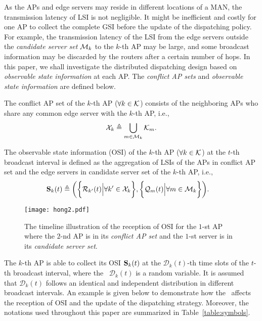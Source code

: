 As the APs and edge servers may reside in different locations of a MAN, the transmission latency of LSI is not negligible.
It might be inefficient {and costly} for one AP to collect the complete GSI before the update of the dispatching policy.
For example, the transmission latency of the LSI from the edge servers outside the \emph{candidate server set} $\mathcal{M}_{k}$ to the $k$-th AP may be large, and some broadcast information may be discarded by the routers after a certain number of hops.
In this paper, we shall investigate the distributed dispatching design based on \emph{observable state information} at each AP.
The \emph{conflict AP sets} and \emph{observable state information} are defined below.
\begin{definition}
    The conflict AP set of the $k$-th AP ($\forall k\in\mathcal{K}$) consists of the neighboring APs who share any common edge server with the $k$-th AP, i.e.,
    \begin{align}
        \mathcal{X}_{k} \triangleq \bigcup_{m\in\mathcal{M}_{k}} \mathcal{K}_{m}.
    \end{align}
\end{definition}

\begin{definition}
    The observable state information (OSI) of the $k$-th AP ($\forall k\in\mathcal{K}$) at the $t$-th broadcast interval is defined as the aggregation of LSIs of the APs in {conflict AP set} and the edge servers in {candidate server set} of the $k$-th AP, i.e.,
    {\small
    \begin{align}
        \mathbf{S}_{k}(t) &\triangleq
        \bigg(
            \bigg\{\mathcal{R}_{k'}(t) \Big| \forall k'\in\mathcal{X}_{k}\bigg\},
            \bigg\{\mathcal{Q}_{m}(t) \Big| \forall m\in\mathcal{M}_{k}\bigg\}
        \bigg).
    \end{align}
    }%
    \label{def:OSI}
\end{definition}

\begin{figure*}[t]
    \centering
    \texttt{[image: hong2.pdf]}
    \caption{The timeline illustration of the reception of OSI for the $1$-st AP where the $2$-nd AP is in its \emph{conflict AP set} and the $1$-st server is in its \emph{candidate server set}.}
    \label{fig:brd_timeline}
\end{figure*}

The $k$-th AP is able to collect its OSI $\mathbf{S}_{k}(t)$ at the $\mathcal{D}_{k}(t)$-th time slots of the $t$-th broadcast interval, where the \emph{\brlatency}~$\mathcal{D}_{k}(t)$ is a random variable.
It is assumed that $\mathcal{D}_{k}(t)$ follows an identical and independent distribution in different broadcast intervals.
An example is given below to demonstrate how the \brlatency~affects the reception of OSI and the update of the dispatching strategy.
Moreover, the notations used throughout this paper are summarized in Table~\ref{table:symbols}.

